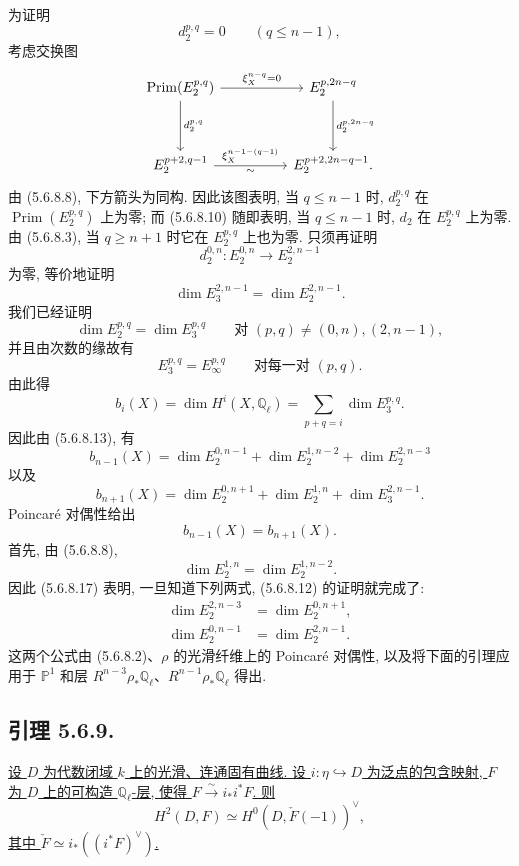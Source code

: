 为证明
\[
d_2^{p,q}=0\qquad(q\leq n-1),
\]
考虑交换图
\[
\begin{tikzcd}[column sep=huge,row sep=huge]
\operatorname{Prim}(E_2^{p,q})
  \arrow[r,"\xi_X^{n-q}=0"]
  \arrow[d,"d_2^{p,q}"]
&
E_2^{p,2n-q}
  \arrow[d,"d_2^{p,2n-q}"]
\\
E_2^{p+2,q-1}
  \arrow[r,"\xi_X^{n-1-(q-1)}","\sim"']
&
E_2^{p+2,2n-q-1}.
\end{tikzcd}
\]
由 (5.6.8.8), 下方箭头为同构. 因此该图表明, 当 $q\leq n-1$ 时, $d_2^{p,q}$ 在 $\operatorname{Prim}(E_2^{p,q})$ 上为零; 而 (5.6.8.10) 随即表明, 当 $q\leq n-1$ 时, $d_2$ 在 $E_2^{p,q}$ 上为零. 由 (5.6.8.3), 当 $q\geq n+1$ 时它在 $E_2^{p,q}$ 上也为零. 只须再证明
\[
d_2^{0,n}:E_2^{0,n}\longrightarrow E_2^{2,n-1}
\]
为零, 等价地证明
\begin{equation}\tag{5.6.8.12}
\dim E_3^{2,n-1}=\dim E_2^{2,n-1}.
\end{equation}
我们已经证明
\begin{equation}\tag{5.6.8.13}
\dim E_2^{p,q}=\dim E_3^{p,q}
\qquad\text{对 }(p,q)\neq(0,n),(2,n-1),
\end{equation}
并且由次数的缘故有
\begin{equation}\tag{5.6.8.14}
E_3^{p,q}=E_\infty^{p,q}
\qquad\text{对每一对 }(p,q).
\end{equation}
由此得
\[
b_i(X)=\dim H^i(X,\mathbb Q_\ell)
=\sum_{p+q=i}\dim E_3^{p,q}.
\]
因此由 (5.6.8.13), 有
\begin{equation}\tag{5.6.8.15}
b_{n-1}(X)
=\dim E_2^{0,n-1}
 +\dim E_2^{1,n-2}
 +\dim E_2^{2,n-3}
\end{equation}
以及
\begin{equation}\tag{5.6.8.16}
b_{n+1}(X)
=\dim E_2^{0,n+1}
 +\dim E_2^{1,n}
 +\dim E_3^{2,n-1}.
\end{equation}
Poincaré 对偶性给出
\begin{equation}\tag{5.6.8.17}
b_{n-1}(X)=b_{n+1}(X).
\end{equation}
首先, 由 (5.6.8.8),
\[
\dim E_2^{1,n}=\dim E_2^{1,n-2}.
\]
因此 (5.6.8.17) 表明, 一旦知道下列两式, (5.6.8.12) 的证明就完成了:
\begin{align}
\dim E_2^{2,n-3}&=\dim E_2^{0,n+1},
\tag{5.6.8.18}\\
\dim E_2^{0,n-1}&=\dim E_2^{2,n-1}.
\tag{5.6.8.19}
\end{align}
这两个公式由 (5.6.8.2)、$\rho$ 的光滑纤维上的 Poincaré 对偶性, 以及将下面的引理应用于 $\mathbb P^1$ 和层 $R^{n-3}\rho_*\mathbb Q_\ell$、$R^{n-1}\rho_*\mathbb Q_\ell$ 得出.

\subsection*{引理 5.6.9.}
\underline{设 $D$ 为代数闭域 $k$ 上的光滑、连通固有曲线. 设 $i:\eta\hookrightarrow D$ 为泛点的包含映射, $F$ 为 $D$ 上的可构造 $\mathbb Q_\ell$-层, 使得 $F\overset{\sim}{\longrightarrow}i_*i^*F$. 则}
\[
H^2(D,F)\simeq H^0(D,\check F(-1))^\vee,
\]
\underline{其中 $\check F\simeq i_*((i^*F)^\vee)$.}

